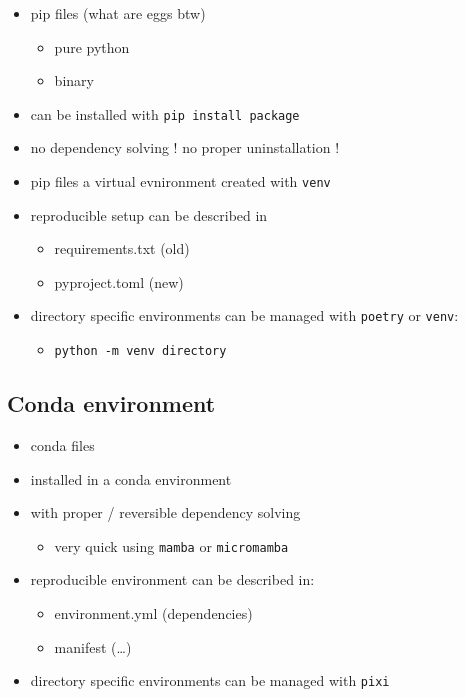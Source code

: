 \documentclass[
  letterpaper,
  DIV=11,
  numbers=noendperiod]{scrartcl}
\providecommand{\tightlist}{%
  \setlength{\itemsep}{0pt}\setlength{\parskip}{0pt}}\usepackage{longtable,booktabs,array}
\begin{document}
\begin{itemize}
\item
  pip files (what are eggs btw)

  \begin{itemize}
  \tightlist
  \item
    pure python
  \item
    binary
  \end{itemize}
\item
  can be installed with \texttt{pip\ install\ package}
\item
  no dependency solving ! no proper uninstallation !
\item
  pip files a virtual evnironment created with \texttt{venv}
\item
  reproducible setup can be described in

  \begin{itemize}
  \tightlist
  \item
    requirements.txt (old)
  \item
    pyproject.toml (new)
  \end{itemize}
\item
  directory specific environments can be managed with \texttt{poetry} or
  \texttt{venv}:

  \begin{itemize}
  \tightlist
  \item
    \texttt{python\ -m\ venv\ directory}
  \end{itemize}
\end{itemize}

\subsection{Conda environment}\label{conda-environment}

\begin{itemize}
\item
  conda files
\item
  installed in a conda environment
\item
  with proper / reversible dependency solving

  \begin{itemize}
  \tightlist
  \item
    very quick using \texttt{mamba} or \texttt{micromamba}
  \end{itemize}
\item
  reproducible environment can be described in:

  \begin{itemize}
  \tightlist
  \item
    environment.yml (dependencies)
  \item
    manifest (\ldots)
  \end{itemize}
\item
  directory specific environments can be managed with \texttt{pixi}
\end{itemize}
\end{document}
